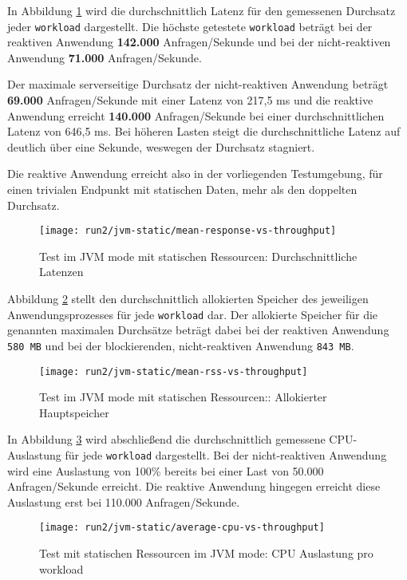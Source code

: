 In Abbildung \ref{fig:jvm_static_mean_response} wird die durchschnittlich Latenz für den gemessenen Durchsatz jeder \verb|workload| dargestellt.
Die höchste getestete \verb|workload| beträgt bei der reaktiven Anwendung \textbf{142.000} Anfragen/Sekunde und bei der
nicht-reaktiven Anwendung \textbf{71.000} Anfragen/Sekunde.

Der maximale serverseitige Durchsatz der nicht-reaktiven Anwendung beträgt \textbf{69.000} Anfragen/Sekunde mit einer
Latenz von 217,5 ms und
die reaktive Anwendung erreicht \textbf{140.000} Anfragen/Sekunde bei einer durchschnittlichen Latenz von 646,5 ms.
Bei höheren Lasten steigt die durchschnittliche Latenz auf deutlich über eine Sekunde, weswegen der Durchsatz stagniert.

Die reaktive Anwendung erreicht also in der vorliegenden Testumgebung, für einen trivialen
Endpunkt mit statischen Daten, mehr als den doppelten Durchsatz.
\newpage
\begin{figure}[ht!]
  \texttt{[image: run2/jvm-static/mean-response-vs-throughput]}
  \caption{Test im JVM mode mit statischen Ressourcen: Durchschnittliche Latenzen}
  \label{fig:jvm_static_mean_response}
\end{figure}
Abbildung \ref{fig:jvm_static_mean_rss} stellt den durchschnittlich allokierten Speicher des jeweiligen Anwendungsprozesses
für jede \verb|workload| dar. Der allokierte Speicher für die genannten maximalen Durchsätze beträgt dabei bei
der reaktiven Anwendung \verb|580 MB| und bei der blockierenden, nicht-reaktiven Anwendung \verb|843 MB|.
\newpage
\begin{figure}[ht!]
  \texttt{[image: run2/jvm-static/mean-rss-vs-throughput]}
  \caption{Test im JVM mode mit statischen Ressourcen:: Allokierter Hauptspeicher}
  \label{fig:jvm_static_mean_rss}
\end{figure}
In Abbildung \ref{fig:jvm_static_avg_cpu} wird abschließend die durchschnittlich gemessene CPU-Auslastung für jede \verb|workload|
dargestellt. Bei der nicht-reaktiven Anwendung wird eine Auslastung von 100\% bereits bei einer Last von
50.000 Anfragen/Sekunde erreicht. Die reaktive Anwendung hingegen erreicht diese Auslastung erst bei 110.000 Anfragen/Sekunde.
\newpage
\begin{figure}[ht!]
  \centering
  \texttt{[image: run2/jvm-static/average-cpu-vs-throughput]}
  \caption{Test mit statischen Ressourcen im JVM mode: CPU Auslastung pro workload}
  \label{fig:jvm_static_avg_cpu}
\end{figure}

